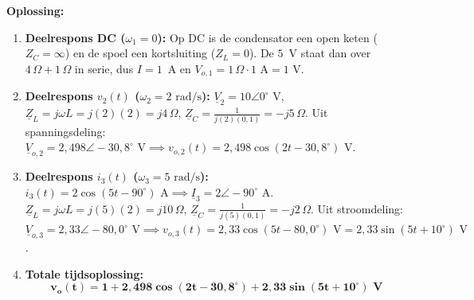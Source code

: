 \documentclass[a4paper,11pt]{article}
\begin{document}
\begin{oefening}
    \textbf{Oplossing:}
    \begin{enumerate}
        \item \textbf{Deelrespons DC ($\omega_1 = 0$):}
              Op DC is de condensator een open keten ($Z_C = \infty$) en de spoel een kortsluiting ($Z_L = 0$).
              De $5$~V staat dan over $4\,\Omega + 1\,\Omega$ in serie, dus $I = 1$~A en
              $V_{o,1} = 1\,\Omega \cdot 1\text{ A} = 1\text{ V}$.
        \item \textbf{Deelrespons $v_2(t)$ ($\omega_2 = 2\text{ rad/s}$):}
              $\underline{V}_2 = 10\angle 0^\circ\text{ V}$, $\underline{Z}_L = j\omega L = j(2)(2) = j4\,\Omega$, $\underline{Z}_C = \frac{1}{j(2)(0{,}1)} = -j5\,\Omega$.
              Uit spanningsdeling: $\underline{V}_{o,2} = 2{,}498\angle -30{,}8^\circ\text{ V} \implies v_{o,2}(t) = 2{,}498\cos(2t - 30{,}8^\circ)\text{ V}$.
        \item \textbf{Deelrespons $i_3(t)$ ($\omega_3 = 5\text{ rad/s}$):}
              $i_3(t) = 2\cos(5t - 90^\circ)\text{ A} \implies \underline{I}_3 = 2\angle -90^\circ\text{ A}$.
              $\underline{Z}_L = j\omega L = j(5)(2) = j10\,\Omega$, $\underline{Z}_C = \frac{1}{j(5)(0{,}1)} = -j2\,\Omega$.
              Uit stroomdeling: $\underline{V}_{o,3} = 2{,}33\angle -80{,}0^\circ\text{ V} \implies v_{o,3}(t) = 2{,}33\cos(5t - 80{,}0^\circ)\text{ V} = 2{,}33\sin(5t + 10^\circ)\text{ V}$.
        \item \textbf{Totale tijdsoplossing:}
              \[\mathbf{v_o(t) = 1 + 2{,}498\cos(2t - 30{,}8^\circ) + 2{,}33\sin(5t + 10^\circ)\text{ V}}\]
    \end{enumerate}
\end{oefening}
\end{document}
